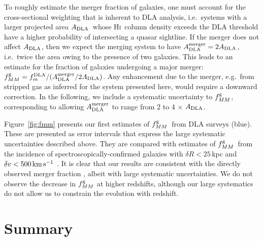 \documentclass[twocolumn]{aastex62}
\newcommand{\mrperp}{R}
\newcommand{\mfmdla}{f_m^{\rm DLA}}    %
\newcommand{\madla}{A_{\rm DLA}}  %
\newcommand{\adla}{$\madla$}
\newcommand{\mfmg}{f_{MM}^{\rm g}}    %
\newcommand{\fmg}{$\mfmg$}
\newcommand{\mkms}{\rm km \, s^{-1}}
\newcommand{\hi}{H\textsc{i}}
\begin{document}
To roughly estimate the merger fraction of galaxies, one must account for the 
cross-sectional weighting that is inherent to DLA analysis, i.e.\ systems with 
a larger projected area \adla\ whose \hi\ column density exceeds the DLA threshold 
have a higher probability of intersecting a quasar sightline. If the merger does 
not affect \adla, then we expect the merging system to have $\madla^{\rm merger} = 
2 \madla$, i.e.\ twice the area owing to the presence of two galaxies. 
This leads to an estimate for the fraction of galaxies undergoing a major 
merger: $\mfmg = \mfmdla / (\madla^{\rm merger} / 2 \madla)$.
Any enhancement due to the merger, e.g.\ from stripped gas as inferred for the 
system presented here, would require a downward correction. In the following, we 
include a systematic uncertainty to $\mfmg$, corresponding to  allowing 
$\madla^{\rm merger}$ to range from 2 to 4 $\times$ \adla.


%

Figure~\ref{fig:fmm} presents our first estimates of \fmg\ from DLA surveys (blue).  
These 
are presented as error intervals that express the large systematic uncertainties described 
above. They are compared with estimates of \fmg\ from the incidence of 
spectroscopically-confirmed galaxies with $\delta \mrperp < 25$\,kpc and 
$\delta v < 500 \, \mkms$ \citep[green; ][]{ventou+2017}. It is clear that our 
results are consistent with the directly observed merger fraction \citep{ventou+2019}, 
albeit with large systematic uncertainties. We do not observe the decrease in $\mfmg$ 
at higher redshifts, although our large systematics do not allow us to constrain the 
evolution with redshift.

\section{Summary}
\label{sec:conclude}
\end{document}
